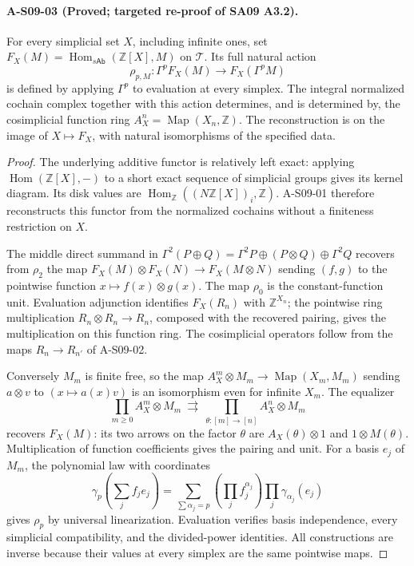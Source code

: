 \paragraph{A-S09-03 (Proved; targeted re-proof of SA09 A3.2).}
For every simplicial set $X$, including infinite ones, set
$F_X(M)=\operatorname{Hom}_{s\mathsf{Ab}}(\mathbb Z[X],M)$ on
$\mathcal T$.  Its full natural action
\[
 \rho_{p,M}:\Gamma^p F_X(M)\longrightarrow F_X(\Gamma^pM)
\]
is defined by applying $\Gamma^p$ to evaluation at every simplex.
The integral normalized cochain complex together with this action
determines, and is determined by, the cosimplicial function ring
$A_X^n=\operatorname{Map}(X_n,\mathbb Z)$.  The reconstruction is
on the image of $X\mapsto F_X$, with natural isomorphisms of the
specified data.

\begin{proof}
The underlying additive functor is relatively left exact: applying
$\operatorname{Hom}(\mathbb Z[X],-)$ to a short exact sequence of
simplicial groups gives its kernel diagram.  Its disk values are
$\operatorname{Hom}_{\mathbb Z}((N\mathbb Z[X])_i,\mathbb Z)$.
A-S09-01 therefore reconstructs this functor from the normalized
cochains without a finiteness restriction on $X$.

The middle direct summand in
$\Gamma^2(P\oplus Q)=\Gamma^2P\oplus(P\otimes Q)\oplus\Gamma^2Q$
recovers from $\rho_2$ the map
$F_X(M)\otimes F_X(N)\to F_X(M\otimes N)$ sending $(f,g)$ to
the pointwise function $x\mapsto f(x)\otimes g(x)$.
The map $\rho_0$ is the constant-function unit.  Evaluation adjunction
identifies $F_X(R_n)$ with $\mathbb Z^{X_n}$; the pointwise ring
multiplication $R_n\otimes R_n\to R_n$, composed with the recovered
pairing, gives the multiplication on this function ring.  The
cosimplicial operators follow from the maps $R_n\to R_{n'}$ of
A-S09-02.

Conversely $M_m$ is finite free, so the map
$A_X^m\otimes M_m\to\operatorname{Map}(X_m,M_m)$ sending
$a\otimes v$ to $(x\mapsto a(x)v)$ is an isomorphism even for
infinite $X_m$.  The equalizer
\[
 \prod_{m\geq0} A_X^m\otimes M_m
 \ \rightrightarrows\
 \prod_{\theta:[m]\to[n]} A_X^n\otimes M_m
 \tag{S09.3}
\]
recovers $F_X(M)$: its two arrows on the factor $\theta$ are
$A_X(\theta)\otimes1$ and $1\otimes M(\theta)$.
Multiplication of function coefficients gives the pairing and unit.
For a basis $e_j$ of $M_m$, the polynomial law with coordinates
\[
 \gamma_p\!\left(\sum_j f_j e_j\right)
 =\sum_{\sum\alpha_j=p}
 \left(\prod_j f_j^{\alpha_j}\right)
 \prod_j\gamma_{\alpha_j}(e_j)
\]
gives $\rho_p$ by universal linearization.  Evaluation verifies basis
independence, every simplicial compatibility, and the divided-power
identities.  All constructions are inverse because their values at
every simplex are the same pointwise maps.
\end{proof}

